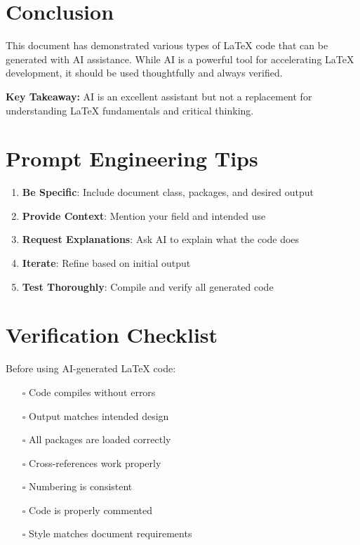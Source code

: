 \documentclass[12pt, a4paper]{article}
\begin{document}
\section{Conclusion}

This document has demonstrated various types of LaTeX code that can be generated with AI assistance. While AI is a powerful tool for accelerating LaTeX development, it should be used thoughtfully and always verified.

\textbf{Key Takeaway:} AI is an excellent assistant but not a replacement for understanding LaTeX fundamentals and critical thinking.

\vspace{2em}

\begin{center}
\end{center}

\appendix

\section{Prompt Engineering Tips}

\begin{enumerate}
    \item \textbf{Be Specific}: Include document class, packages, and desired output
    \item \textbf{Provide Context}: Mention your field and intended use
    \item \textbf{Request Explanations}: Ask AI to explain what the code does
    \item \textbf{Iterate}: Refine based on initial output
    \item \textbf{Test Thoroughly}: Compile and verify all generated code
\end{enumerate}

\section{Verification Checklist}

Before using AI-generated LaTeX code:
\begin{itemize}
    \item[$\square$] Code compiles without errors
    \item[$\square$] Output matches intended design
    \item[$\square$] All packages are loaded correctly
    \item[$\square$] Cross-references work properly
    \item[$\square$] Numbering is consistent
    \item[$\square$] Code is properly commented
    \item[$\square$] Style matches document requirements
\end{itemize}

\end{document}
